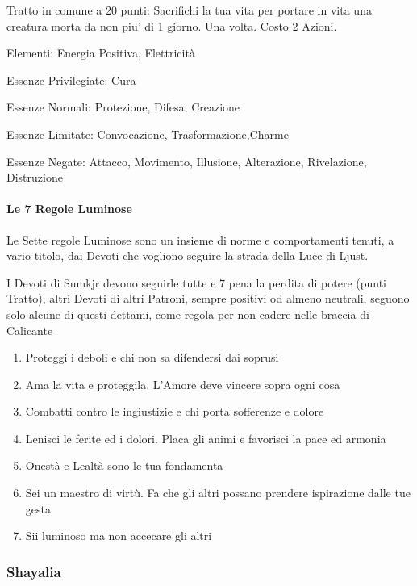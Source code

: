 \documentclass[a4paper,11pt,twoside,openany]{book}
\begin{document}
Tratto in comune a 20 punti: Sacrifichi la tua vita per portare in vita una creatura morta da non piu’ di 1 giorno. Una volta. Costo 2 Azioni.

\bigskip

Elementi: Energia Positiva, Elettricità

\bigskip

Essenze Privilegiate: Cura

Essenze Normali: Protezione, Difesa, Creazione

Essenze Limitate: Convocazione, Trasformazione,Charme

Essenze Negate: Attacco, Movimento, Illusione, Alterazione, Rivelazione, Distruzione

\bigskip

\paragraph{Le 7 Regole Luminose}

\label{le-7-regole-luminose}

Le Sette regole Luminose sono un insieme di norme e comportamenti tenuti, a vario titolo, dai Devoti che vogliono seguire la strada della Luce di Ljust.

I Devoti di Sumkjr devono seguirle tutte e 7 pena la perdita di potere (punti Tratto), altri Devoti di altri Patroni, sempre positivi od almeno neutrali, seguono solo alcune di questi dettami, come regola per non cadere nelle braccia di Calicante


\begin{enumerate}
	\item Proteggi i deboli e chi non sa difendersi dai soprusi
	\item Ama la vita e proteggila. L'Amore deve vincere sopra ogni cosa
	\item Combatti contro le ingiustizie e chi porta sofferenze e dolore
	\item Lenisci le ferite ed i dolori. Placa gli animi e favorisci la pace
	      ed armonia
	\item Onestà e Lealtà sono le tua fondamenta
	\item Sei un maestro di virtù. Fa che gli altri possano prendere ispirazione
	      dalle tue gesta
	\item Sii luminoso ma non accecare gli altri
\end{enumerate}

\subsubsection{Shayalia}
\end{document}
